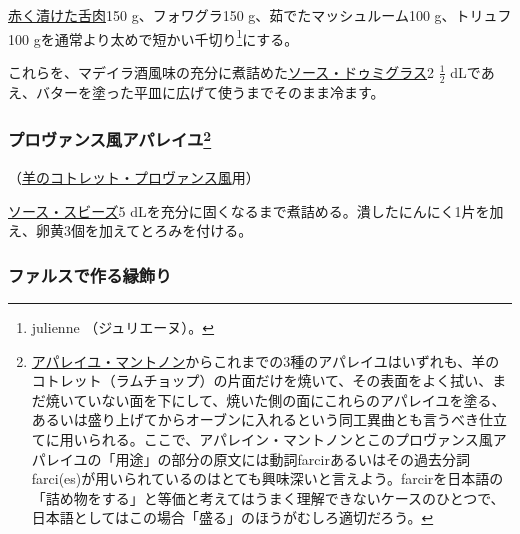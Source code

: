 \begin{recette}
\protect\hyperlink{saumure-liquide-pour-langues}{赤く漬けた舌肉}150
g、フォワグラ150 g、茹でたマッシュルーム100 g、トリュフ100
gを通常より太めで短かい千切り\footnote{julienne （ジュリエーヌ）。}にする。

これらを、マデイラ酒風味の充分に煮詰めた\protect\hyperlink{sauce-demi-glace}{ソース・ドゥミグラス}2
\(\frac{1}{2}\)
dLであえ、バターを塗った平皿に広げて使うまでそのまま冷ます。

\atoaki{}

\hypertarget{appareil-provencal}{%
\subsubsection[プロヴァンス風アパレイユ]{\texorpdfstring{プロヴァンス風アパレイユ\footnote{\protect\hyperlink{appareil-maintenon}{アパレイユ・マントノン}からこれまでの3種のアパレイユはいずれも、羊のコトレット（ラムチョップ）の片面だけを焼いて、その表面をよく拭い、まだ焼いていない面を下にして、焼いた側の面にこれらのアパレイユを塗る、あるいは盛り上げてからオーブンに入れるという同工異曲とも言うべき仕立てに用いられる。ここで、アパレイン・マントノンとこのプロヴァンス風アパレイユの「用途」の部分の原文には動詞farcirあるいはその過去分詞farci(es)が用いられているのはとても興味深いと言えよう。farcirを日本語の「詰め物をする」と等価と考えてはうまく理解できないケースのひとつで、日本語としてはこの場合「盛る」のほうがむしろ適切だろう。}}{プロヴァンス風アパレイユ}}\label{appareil-provencal}}



（\protect\hyperlink{cotelettes-provencale}{羊のコトレット・プロヴァンス風}用）

\protect\hyperlink{sauce-soubise}{ソース・スビーズ}5
dLを充分に固くなるまで煮詰める。潰したにんにく1片を加え、卵黄3個を加えてとろみを付ける。

\atoaki{}

\hypertarget{bordures-en-farce}{%
\subsubsection{ファルスで作る縁飾り}\label{bordures-en-farce}}


\end{recette}
